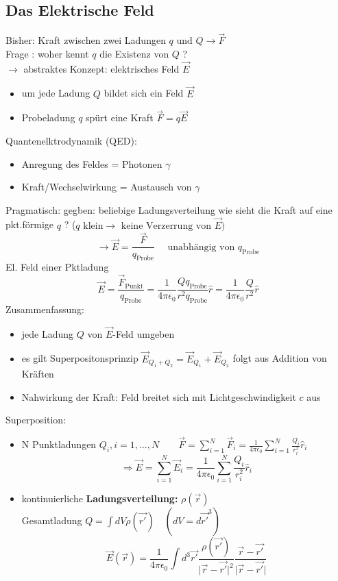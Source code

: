 \documentclass[titlepage,12pt,a4paper,ngerman]{report}
\newcommand{\tx}[1]{\textrm{#1}}
\begin{document}

\subsection{Das Elektrische Feld}
Bisher: Kraft zwischen zwei Ladungen $ q\textrm{ und } Q \rightarrow \vec{F}$\\
Frage : woher kennt $q$ die Existenz von $Q$ ?\\
$\rightarrow$ abstraktes Konzept: elektrisches Feld $\vec{E}$
\begin{itemize}
\item um jede Ladung $Q$ bildet sich ein Feld $\vec{E}$
\item Probeladung $q$ spürt eine Kraft $ \vec{F} = q \vec{E}$
\end{itemize}
Quantenelktrodynamik (QED): 
\begin{itemize}
\item Anregung des Feldes = Photonen $\gamma $ 
\item Kraft/Wechselwirkung = Austausch von $\gamma$
\end{itemize} 
Pragmatisch: gegben: beliebige Ladungsverteilung wie sieht die Kraft auf eine pkt.förmige $q$ ? ($q \textrm{ klein} \rightarrow \textrm{ keine Verzerrung von } \vec{E})$
$$\rightarrow \vec{E} = \frac{\vec{F}}{q_{\tx{Probe}}} \quad \textrm{ unabhängig von } q_{\tx{Probe}}$$
El. Feld einer Pktladung 
$$ \vec{E} = \frac{\vec{F}_{\tx{Punkt}}}{q_{\tx{Probe}}} = \frac{1}{4 \pi \epsilon_{0}} \frac{Q q_{\tx{Probe}}}{r^2 q_{\tx{Probe}}} \hat{r} = \frac{1}{4 \pi \epsilon_{0}} \frac{Q}{r^2} \hat{r}$$
Zusammenfassung: 
\begin{itemize}
\item jede Ladung $Q$ von $\vec{E}$-Feld umgeben
\item es gilt Superpositonsprinzip $\vec{E}_{Q_1 + Q_2} = \vec{E}_{Q_1} + \vec{E}_{Q_2}$ folgt aus Addition von Kräften
\item Nahwirkung der Kraft: Feld breitet sich mit Lichtgeschwindigkeit $c$ aus
\end{itemize}
Superposition:
\begin{itemize}
\item N Punktladungen $Q_i, i = 1, \dots , N
\qquad \vec{F} = \sum _{i=1}^{N} \vec{F}_i = \frac{1}{4 \pi \epsilon_{0}} \sum _{i=1}^{N} \frac{Q_i}{r^2_i} \hat{r}_i$
$$ \Rightarrow \vec{E} = \sum _{i=1}^{N} \vec{E}_i = \frac{1}{4 \pi \epsilon_{0}}  \sum _{i=1}^{N} \frac{Q_i}{r^2_i} \hat{r}_i$$
\item kontinuierliche \textbf{Ladungsverteilung:} $\rho(\vec{r})$\\[5pt]
Gesamtladung $Q = \int dV \rho(\vec{r'}) \quad (dV = d \vec{r'}^{3})$
$$\vec{E} (\vec{r}) = \frac{1}{4 \pi \epsilon_0} \int d^3 \vec{r'} \frac{\rho (\vec{r'})}{\vert \vec{r}-\vec{r'} \vert ^2} \frac{\vec{r}-\vec{r'}}{\vert \vec{r}-\vec{r'} \vert}$$
\end{itemize}
\end{document}
